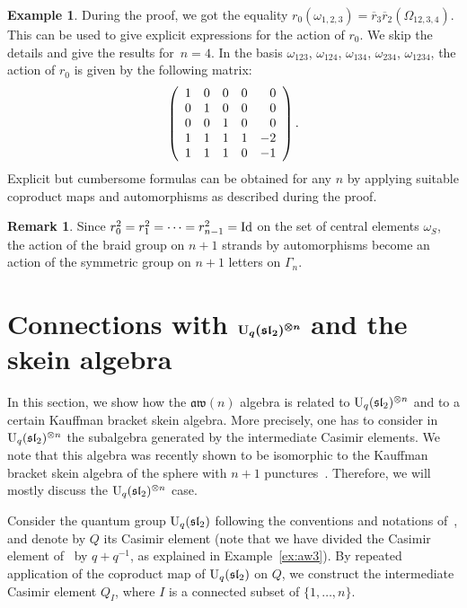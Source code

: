 \documentclass[pdftex]{sigma}
\numberwithin{equation}{section}
\theoremstyle{definition}
\newtheorem{exam}[theo]{Example}
\newtheorem{rema}[theo]{Remark}
\newcommand{\rb}{\overline{r}}
\newcommand{\aw}{\mathfrak{aw}(n)}
\begin{document}
\begin{exam}
During the proof, we got the equality $r_0(\omega_{1,2,3})=\rb_3\rb_2(\varOmega_{12,3,4})$. This can be used to give explicit expressions for the action of $r_0$. We skip the details and give the results for~${n=4}$. In the basis $\omega_{123}$, $\omega_{124}$, $\omega_{134}$, $\omega_{234}$, $\omega_{1234}$, the action of $r_0$ is given by the following matrix:
\[\left(\begin{array}{ccccc} 1 & 0 & 0 & 0 & \hphantom{-}0 \\
0 & 1 & 0 & 0 & \hphantom{-}0\\
0 & 0 & 1 & 0 & \hphantom{-}0\\
1 & 1 & 1 & 1 & -2\\
1 & 1 & 1 & 0 & -1\end{array}\right) .\]
Explicit but cumbersome formulas can be obtained for any $n$ by applying suitable coproduct maps and automorphisms as described during the proof.
\end{exam}


\begin{rema}
Since $r_0^2=r_1^2=\dots=r_{n-1}^2={\rm Id}$ on the set of central elements $\omega_S$, the action of the braid group on $n+1$ strands by automorphisms become an action of the symmetric group on $n+1$ letters on $\Gamma_n$.
\end{rema}

\section[Connections with U\_q(sl\_2)\^{}\{otimes n\} and the skein algebra]{Connections with $\boldsymbol{{\rm U}_q(\mathfrak{sl}_2)^{\otimes n}}$ and the skein algebra}\label{sec-connections}
In this section, we show how the $\aw$ algebra is related to ${\rm U}_q(\mathfrak{sl}_2)^{\otimes n}$ and to a certain Kauffman bracket skein algebra.
More precisely, one has to consider in ${\rm U}_q(\mathfrak{sl}_2)^{\otimes n}$ the subalgebra generated by the intermediate Casimir elements. We note that this algebra was recently shown to be isomorphic to the Kauffman bracket skein algebra of the sphere with $n+1$ punctures~\cite{CL}.
Therefore, we will mostly discuss the ${\rm U}_q(\mathfrak{sl}_2)^{\otimes n}$ case.

Consider the quantum group ${\rm U}_q(\mathfrak{sl}_2)$ following the conventions and notations of~\cite{avatar}, and denote by $Q$ its Casimir element (note that we have divided the Casimir element of~\cite{avatar} by $q+q^{-1}$, as explained in Example~\ref{ex:aw3}). By repeated application of the coproduct map of ${\rm U}_q(\mathfrak{sl}_2)$ on $Q$,
we construct the intermediate Casimir element $Q_I$, where $I$ is a connected subset of $\{1,\dots,n\}$.
\end{document}
